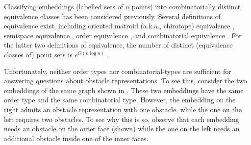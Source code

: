 \documentclass{patmorin}
\begin{document}
Classifying embeddings (labelled sets of $n$ points) into combinatorially
distinct equivalence classes has been considered previously. Several
definitions of equivalence exist, including oriented matroid (a.k.a.,
chirotope) equivalence
\cite{bland.vergnas:orientability,folkman.lawrence:oriented},
semispace equivalence \cite{goodman.pollack:semispaces}, order equivalence
\cite{goodman.pollack:multidimensional}, and combinatorial equivalence
\cite{goodman:on,goodman.pollack:semispaces}.  For the latter two
definitions of equivalence, the number of distinct (equivalence classes
of) point sets is $e^{O(n\log n)}$ \cite{goodman.pollack:upper}.


Unfortunately, neither order types nor combinatorial-types are
sufficient for answering questions about obstacle representations.
To see this, consider the two embeddings of the same graph shown in
.  These two embeddings have the same order
type and the same combinatorial type. However, the embedding on the right
admits an obstacle representation with one obstacle, while the one on
the left requires two obstacles. To see why this is so, observe that
each embedding needs an obstacle on the outer face (shown) while the one
on the left needs an additional obstacle inside one of the inner faces.
\end{document}
